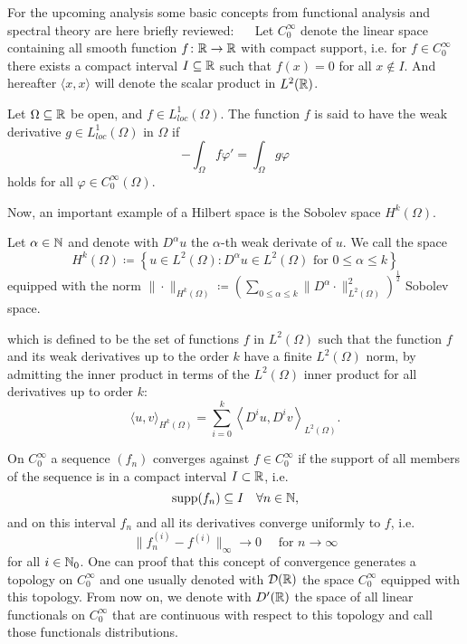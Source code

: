 For the upcoming analysis some basic concepts from functional analysis and spectral theory are here briefly reviewed:
~\newline ~\newline
Let $C_{0}^{\infty}$ denote the linear space containing all smooth function $f \colon \mathbb{R} \rightarrow \mathbb{R}$ with compact support, i.e. for $f \in C_{0}^{\infty}$ there exists a compact interval $I \subseteq \mathbb{R}$ such that $f(x) = 0$ for all $x \notin I$. And hereafter $\langle x, x \rangle$ will denote the scalar product in $L^{2}(\mathbb{R})$.
\begin{definition}
Let $\Omega \subseteq \mathbb{R}$ be open, and $f \in L^{1}_{loc}(\Omega)$. The function $f$ is said to have the weak derivative $g \in L^{1}_{loc}(\Omega)$ in $\Omega$ if
  \[ - \int_{\Omega} f \varphi' = \int_{\Omega} g \varphi \]
holds for all $\varphi \in C_{0}^{\infty}(\Omega)$.
\end{definition}
Now, an important example of a Hilbert space is the Sobolev space $H^{k}(\Omega)$.
\begin{definition} Let $\alpha \in \mathbb{N}$ and denote with $D^{\alpha} u$ the $\alpha$-th weak derivate of $u$. We call the space
\[ H^{k}(\Omega) \coloneqq \left\{ u \in L^{2}(\Omega) : D^{\alpha} u \in L^{2}(\Omega) \text{ for } 0 \leq \alpha \leq k \right\} \]
equipped with the norm $\| \cdot \|_{H^{k}(\Omega)} \coloneqq \left( \sum_{0 \leq \alpha \leq k} \| D^{\alpha} \cdot \|_{L^{2}(\Omega)}^{2} \right)^{\frac{1}{2}}$ Sobolev space.
\end{definition}
 which is defined to be the set of functions $f$ in $L^{2}(\Omega)$ such that the function $f$ and its weak derivatives up to the order $k$ have a finite $L^{2}(\Omega)$ norm, by admitting the inner product in terms of the $L^{2}(\Omega)$ inner product for all derivatives up to order $k$: 
	\[ \langle u , v \rangle_{H^{k}(\Omega)} = \sum_{i=0}^{k} \left\langle D^{i}u , D^{i} v \right\rangle_{L^{2}(\Omega)}. \] 	

\begin{definition}[Distributions]
	On $C_{0}^{\infty}$ a sequence $(f_{n})$ converges against $f \in C_{0}^{\infty}$ if the support of all members of the sequence is in a compact interval $I \subset \mathbb{R}$, i.e.
	$$ \operatorname{supp} (f_{n}) \subseteq I \quad \forall n \in \mathbb{N}, $$
	and on this interval $f_{n}$ and all its derivatives converge uniformly to $f$, i.e.
	\[ \| f_{n}^{(i)} - f^{(i)} \|_{\infty} \rightarrow 0 \quad \text{ for } n \rightarrow \infty \]
	for all $i \in \mathbb{N}_{0}$. One can proof that this concept of convergence generates a topology on $C_{0}^{\infty}$ and one usually denoted with $\mathcal{D}(\mathbb{R})$ the space $C_{0}^{\infty}$ equipped with this topology. From now on, we denote with $D'(\mathbb{R})$ the space of all linear functionals on $C_{0}^{\infty}$ that are continuous with respect to this topology and call those functionals distributions.
\end{definition}

